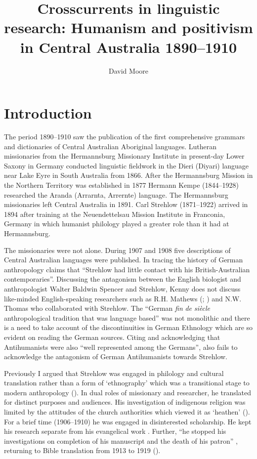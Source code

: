 \documentclass[english,output=paper,colorlinks,citecolor=brown]{../langscibook}
\author{David Moore\affiliation{University of Western Australia}\orcid{}}
\title{Crosscurrents in linguistic research: Humanism and positivism in Central Australia 1890--1910}
\begin{document}
\maketitle

\section{Introduction} 
\largerpage
 The period 1890--1910 saw the publication of the first comprehensive grammars and dictionaries of Central  Australian Aboriginal languages. Lutheran missionaries from the Hermannsburg Missionary Institute in present-day Lower Saxony in Germany conducted linguistic fieldwork in the Dieri (Diyari) language near Lake Eyre in South Australia from 1866. After the Hermannsburg Mission in the Northern Territory was established in 1877 Hermann Kempe (1844--1928) researched the Aranda (Arrarnta, Arrernte) language. The Hermannsburg missionaries left Central Australia in 1891. Carl Strehlow (1871--1922) arrived in 1894 after training at the Neuendettelsau Mission Institute in Franconia, Germany in which humanist philology played a greater role than it had at Hermannsburg.
 
 The missionaries were not alone. During 1907 and 1908 five descriptions of Central Australian languages were published. In tracing the history of German anthropology \citet[51]{Kenny2013} claims that “Strehlow had little contact with his British-Australian contemporaries”. Discussing the antagonism between the English biologist and anthropologist Walter Baldwin Spencer and Strehlow, Kenny does not discuss like-minded English-speaking researchers such as R.H. Mathews (\citealt{Mathews1907}; \citealt{Thomas2007}) and N.W. Thomas who collaborated with Strehlow. The “German \textit{fin} \textit{de} \textit{siècle} anthropological tradition that was language based” \citep[99]{Kenny2013} was not monolithic and there is a need to take account of the discontinuities in German Ethnology which are so evident on reading the German sources. Citing \citet{Monteath2013} and acknowledging that Antihumanists were also “well represented among the Germans”, \citet[228]{Kenny2013} also fails to acknowledge the antagonism of German Antihumanists towards Strehlow.
 
 Previously I argued that Strehlow was engaged in philology and cultural translation rather than a form of ‘ethnography’ which was a transitional stage to modern anthropology (\citealt[336]{MooreRíos-Castaño2018}). In dual roles of missionary and researcher, he translated for distinct purposes and audiences. His investigation of indigenous religion was limited by the attitudes of the church authorities which viewed it as ‘heathen’ (\citealt[338]{MooreRíos-Castaño2018}).  For a brief time (1906--1910) he was engaged in disinterested scholarship. He kept his research separate from his evangelical work \citep[232]{Brock2017}. Further, “he stopped his investigations on completion of his manuscript and the death of his patron” \citep[236]{Brock2017}, returning to Bible translation from 1913 to 1919 (\citealt[336]{MooreRíos-Castaño2018}).
 
\end{document}
